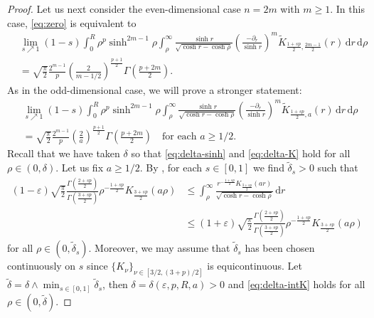 \documentclass[10pt,a4paper]{amsart}
\begin{document}
\begin{proof}
Let us next consider the even-dimensional case $n = 2m$ with $m \geq 1$. In this case, \eqref{eq:zero} is equivalent to
\begin{equation*}
\begin{split}
&\lim_{s \nearrow 1} (1-s) \int_{0}^{R} \rho^{p} \sinh^{2m-1}\rho \int_{\rho}^{\infty} \frac{\sinh r}{\sqrt{\cosh r - \cosh \rho}} \left( \frac{-\partial_{r}}{\sinh r} \right)^{m} \widetilde{K}_{\frac{1+sp}{2},\frac{2m-1}{2}}(r) \, \mathrm{d}r \,\mathrm{d}\rho \\
&= \sqrt{\frac{\pi}{2}} \frac{2^{m-1}}{p} \left( \frac{2}{m-1/2} \right)^{\frac{p+1}{2}} \Gamma\left(\frac{p+2m}{2} \right).
\end{split}
\end{equation*}
As in the odd-dimensional case, we will prove a stronger statement:
\begin{equation} \label{eq:zero-even}
\begin{split}
&\lim_{s \nearrow 1} (1-s) \int_{0}^{R} \rho^{p} \sinh^{2m-1}\rho \int_{\rho}^{\infty} \frac{\sinh r}{\sqrt{\cosh r - \cosh \rho}} \left( \frac{-\partial_{r}}{\sinh r} \right)^{m} \widetilde{K}_{\frac{1+sp}{2},a}(r) \, \mathrm{d}r \,\mathrm{d}\rho \\
&= \sqrt{\frac{\pi}{2}} \frac{2^{m-1}}{p} \left( \frac{2}{a} \right)^{\frac{p+1}{2}} \Gamma\left(\frac{p+2m}{2} \right) \quad\text{for each } a \geq 1/2.
\end{split}
\end{equation}
Recall that we have taken $\delta$ so that \eqref{eq:delta-sinh} and \eqref{eq:delta-K} hold for all $\rho \in (0, \delta)$. Let us fix $a \geq 1/2$. By , for each $s \in [0,1]$ we find $\tilde{\delta}_{s} > 0$ such that
\begin{equation} \label{eq:delta-intK}
\begin{split}
(1-\varepsilon) \sqrt{\frac{\pi}{2}} \frac{\Gamma(\frac{2+sp}{2})}{\Gamma(\frac{3+sp}{2})} \rho^{-\frac{1+sp}{2}} K_{\frac{3+sp}{2}}(a\rho)
&\leq \int_{\rho}^{\infty} \frac{r^{-\frac{1+sp}{2}} K_{\frac{3+sp}{2}}(ar)}{\sqrt{\cosh r - \cosh \rho}} \, \mathrm{d}r \\
&\leq (1+\varepsilon) \sqrt{\frac{\pi}{2}} \frac{\Gamma(\frac{2+sp}{2})}{\Gamma(\frac{3+sp}{2})} \rho^{-\frac{1+sp}{2}} K_{\frac{3+sp}{2}}(a\rho)
\end{split}
\end{equation}
for all $\rho \in (0, \tilde{\delta}_{s})$. Moreover, we may assume that $\tilde{\delta}_{s}$ has been chosen continuously on $s$ since $\{K_\nu\}_{\nu\in [3/2,(3+p)/2]}$ is equicontinuous. Let $\tilde{\delta} = \delta \land \min_{s \in [0,1]} \tilde{\delta}_{s}$, then $\delta = \delta(\varepsilon, p, R, a) > 0$ and \eqref{eq:delta-intK} holds for all $\rho \in (0, \tilde{\delta})$.


\end{proof}
\end{document}
